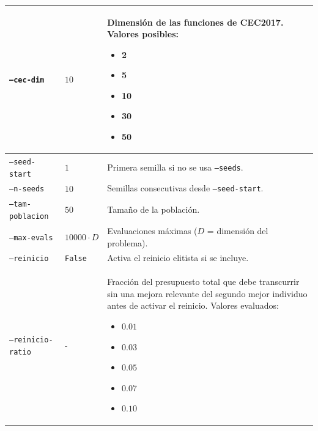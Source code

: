 \begin{longtable}[htbp]{|p{3.3cm}|p{2.8cm}|p{5.15cm}|}
    \texttt{--cec-dim}
                       & \(10\)
                       & Dimensión de las funciones de CEC2017. Valores posibles:
    \begin{itemize}
        \setlength{\itemsep}{0pt}
        \setlength{\topsep}{2pt}
        \item 2
        \item 5
        \item 10
        \item 30
        \item 50
    \end{itemize}                                                                                       \\
    \hline

    \texttt{--seed-start}
                       & \(1\)
                       & Primera semilla si no se usa \texttt{--seeds}.                                            \\
    \hline

    \texttt{--n-seeds}
                       & \(10\)
                       & Semillas consecutivas desde \texttt{--seed-start}.                                        \\
    \hline

    \texttt{--tam-poblacion}
                       & \(50\)
                       & Tamaño de la población.                                                                   \\
    \hline

    \texttt{--max-evals}
                       & \(10000 \cdot D\)
                       & Evaluaciones máximas (\(D\) = dimensión del problema).                                    \\
    \hline

    \texttt{--reinicio}
                       & \texttt{False}
                       & Activa el reinicio elitista si se incluye.                                                \\
    \hline

    \texttt{--reinicio-ratio}
                       & -
                       & Fracción del presupuesto total que debe transcurrir sin una mejora
    relevante del segundo mejor individuo antes de activar el reinicio. Valores evaluados:
    \begin{itemize}
        \setlength{\itemsep}{0pt}
        \setlength{\topsep}{2pt}
        \item \(0.01\)
        \item \(0.03\)
        \item \(0.05\)
        \item \(0.07\)
        \item \(0.10\)
    \end{itemize}                                                                                       \\
    \hline


\end{longtable}
